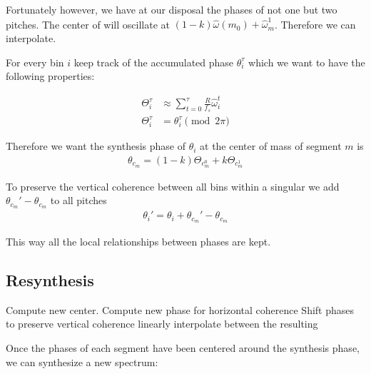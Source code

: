 \documentclass[12pt]{article}
\begin{document}
Fortunately however, we have at our disposal the phases of not one but two pitches.
The center of  will oscillate at $(1 - k)\hat{\omega}(m_0) + \hat{\omega}^1_m$.
Therefore we can interpolate.

For every bin $i$ keep track of the accumulated phase $\theta_i^\tau$ which we want to have the following properties:

\begin{align}
  \Theta_i^\tau &\approx
  \sum_{t = 0}^\tau 
  \frac{R}{f_s}\hat{\omega}_i^t\\
  \Theta_i^\tau &= \theta_i^\tau\pmod{2\pi}
\end{align}



Therefore we want the synthesis phase of $\theta_i$ at the center of mass of segment $m$ is
\begin{align}
  \theta_{c_m} = (1-k)\Theta_{c_m^0} + k\Theta_{c_m^1}
\end{align}

To preserve the vertical coherence between all bins within a singular
we add $\theta_{c_m}' - \theta_{c_m}$ to all pitches
\begin{align}
  \theta_i' = \theta_i + \theta_{c_m}' - \theta_{c_m}
\end{align}

This way all the local relationships between phases are kept.

\subsection{Resynthesis}

Compute new center.
Compute new phase for horizontal coherence
Shift phases to preserve vertical coherence
linearly interpolate between the resulting

Once the phases of each segment have been centered around the synthesis phase,
we can synthesize a new spectrum:

\begin{algorithmic}
\\
\EndFor
\\
  \\
  \\
    \\
    \\
    \\
  \EndFor
\EndFor
\end{algorithmic}
\end{document}
